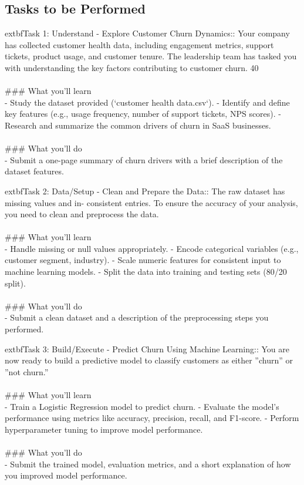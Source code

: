 \documentclass{article}
\begin{document}
\subsection*{Tasks to be Performed}
	extbf{Task 1:} Understand - Explore Customer Churn Dynamics:: Your company has collected customer health data, including engagement metrics, support tickets, product usage, and customer tenure. The leadership team has tasked you with understanding the key factors contributing to customer churn. 40 \\
 \\
### What you'll learn \\
- Study the dataset provided (‘customer health data.csv‘). - Identify and define key features (e.g., usage frequency, number of support tickets, NPS scores). - Research and summarize the common drivers of churn in SaaS businesses. \\
 \\
### What you'll do \\
- Submit a one-page summary of churn drivers with a brief description of the dataset features.

	extbf{Task 2:} Data/Setup - Clean and Prepare the Data:: The raw dataset has missing values and in- consistent entries. To ensure the accuracy of your analysis, you need to clean and preprocess the data. \\
 \\
### What you'll learn \\
- Handle missing or null values appropriately. - Encode categorical variables (e.g., customer segment, industry). - Scale numeric features for consistent input to machine learning models. - Split the data into training and testing sets (80/20 split). \\
 \\
### What you'll do \\
- Submit a clean dataset and a description of the preprocessing steps you performed.

	extbf{Task 3:} Build/Execute - Predict Churn Using Machine Learning:: You are now ready to build a predictive model to classify customers as either ”churn” or ”not churn.” \\
 \\
### What you'll learn \\
- Train a Logistic Regression model to predict churn. - Evaluate the model’s performance using metrics like accuracy, precision, recall, and F1-score. - Perform hyperparameter tuning to improve model performance. \\
 \\
### What you'll do \\
- Submit the trained model, evaluation metrics, and a short explanation of how you improved model performance.
\end{document}
